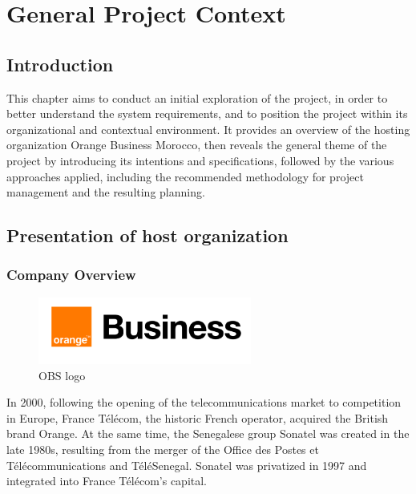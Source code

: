 \chapter{General Project Context}
\label{chap:General Project Context}


\section{Introduction}

This chapter aims to conduct an initial exploration of the project, in order to better understand the system requirements, and to position the project within its organizational and contextual environment. It provides an overview of the hosting organization Orange Business Morocco, then reveals the general theme of the project by introducing its intentions and specifications, followed by the various approaches applied, including the recommended methodology for project management and the resulting planning.


\newpage


\section{Presentation of host organization}



\subsection{Company Overview}

\begin{figure}[H] 
    \centering
    \includegraphics[width=7cm]{Logos/ob.png}
    \caption{OBS logo}
\end{figure}

In 2000, following the opening of the telecommunications market to competition in Europe, France Télécom, the historic French operator, acquired the British brand Orange. At the same time, the Senegalese group Sonatel was created in the late 1980s, resulting from the merger of the Office des Postes et Télécommunications and TéléSenegal. Sonatel was privatized in 1997 and integrated into France Télécom's capital.

